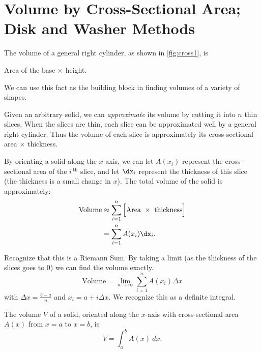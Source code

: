 \section{Volume by Cross-Sectional Area; Disk and Washer Methods}\label{sec:disk}

The volume of a general right cylinder, as shown in \autoref{fig:cross1}, is 
\begin{center}
Area of the base $\times$ height.
\end{center}
We can use this fact as the building block in finding volumes of a variety of shapes.

Given an arbitrary solid, we can \textit{approximate} its volume by cutting it into $n$  thin slices. When the slices are thin, each slice can be approximated well by a general right cylinder. Thus the volume of each slice is approximately its cross-sectional area $\times$ thickness.

By orienting a solid along the $x$-axis, we can let $A(x_i)$ represent the cross-sectional area
of the $i\,^\text{th}$ slice, and let $\dx_i$ represent the thickness of this slice (the thickness is a small change in $x$). The total volume of the solid is approximately:
	\begin{align*} \text{Volume} &\approx \sum_{i=1}^n \Big[\text{Area}\ \times\ \text{thickness}\Big] \\
			&= \sum_{i=1}^n A(x_i)\dx_i.
	\end{align*}
	
Recognize that this is a Riemann Sum. By taking a limit (as the thickness of the slices goes to 0) we can find the volume exactly. 
\[\text{Volume}=\lim_{n\to \infty} \sum_{i=1}^n A(x_i)\Delta x\]
with $\Delta x=\frac{b-a}{n}$ and $x_i=a+i\Delta x$. We recognize this as a definite integral.

{The volume $V$ of a solid, oriented along the $x$-axis with cross-sectional area $A(x)$ from $x=a$ to $x=b$, is 
\[V = \int_a^b A(x)\ dx.\]}

